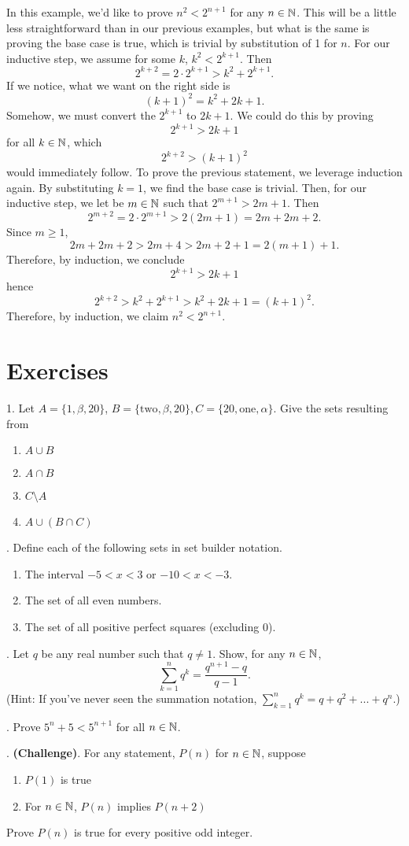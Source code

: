 \begin{ex}
	In this example, we'd like to prove $n^2<2^{n+1}$ for any $n\in\mathbb{N}$. This will be a little less straightforward than in our previous examples, but what is the same is proving the base case is true, which is trivial by substitution of 1 for $n$. For our inductive step, we assume for some $k$, $k^2<2^{k+1}$.
	Then
	$$2^{k+2}=2\cdot 2^{k+1}>k^2+2^{k+1}.$$
	If we notice, what we want on the right side is 
	$$(k+1)^2=k^2+2k+1.$$
	Somehow, we must convert the $2^{k+1}$ to $2k+1$. We could do this by proving 
	$$2^{k+1}>2k+1$$ 
	for all $k\in\mathbb{N}$, which 
	$$2^{k+2}>(k+1)^2$$ 
	would immediately follow.
	To prove the previous statement, we leverage induction again. By substituting $k=1$, we find the base case is trivial. Then, for our inductive step, we let be $m\in\mathbb{N}$ such that $2^{m+1}>2m+1$.
	Then
	$$2^{m+2}=2\cdot2^{m+1}>2(2m+1)=2m+2m+2.$$
	Since $m\ge 1$,
	$$2m+2m+2>2m+4>2m+2+1=2(m+1)+1.$$
	Therefore, by induction, we conclude 
	$$2^{k+1}>2k+1$$
	hence
	$$2^{k+2}>k^2+2^{k+1}>k^2+2k+1=(k+1)^2.$$
	Therefore, by induction, we claim $n^2<2^{n+1}$.
\end{ex}

\section{Exercises}
1. Let $A=\{1,\beta,20\}$, $B=\{\text{two},\beta,20\},C=\{20,\text{one},\alpha\}$. Give the sets resulting from
\begin{enumerate}[label=\alph*)]
	\item $A \cup B$
	\item $A \cap B$
	\item $C \setminus A$
	\item $A \cup (B\cap C)$
\end{enumerate}

. Define each of the following sets in set builder notation.
\begin{enumerate}[label=\alph*)]
	\item The interval $-5<x<3$ or $-10<x<-3$.
	\item The set of all even numbers.
	\item The set of all positive perfect squares (excluding 0).
\end{enumerate}

. Let $q$ be any real number such that $q\neq1$. Show, for any $n\in\mathbb{N}$,
$$\sum_{k=1}^nq^k=\frac{q^{n+1}-q}{q-1}.$$
(Hint: If you've never seen the summation notation, $\sum_{k=1}^nq^k=q+q^2+...+q^n$.)

. Prove $5^n+5<5^{n+1}$ for all $n\in\mathbb{N}$.

. \textbf{(Challenge)}. For any statement, $P(n)$ for $n\in\mathbb{N}$, suppose 
\begin{enumerate}
	\item $P(1)$ is true
	\item For $n\in\mathbb{N}$, $P(n)$ implies $P(n+2)$
\end{enumerate}
Prove $P(n)$ is true for every positive odd integer. 










